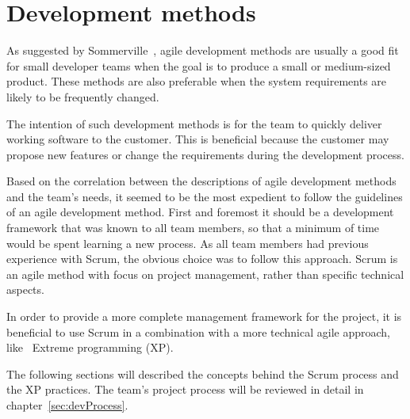 \section{Development methods}
\label{sec:devMethods}

As suggested by Sommerville~\cite{scrum}, agile development methods are usually a good fit for small developer teams when the goal is to produce a small or medium-sized product. These methods are also preferable when the system requirements are likely to be frequently changed.

The intention of such development methods is for the team to quickly deliver working software to the customer. This is beneficial because the customer may propose new features or change the requirements during the development process.

Based on the correlation between the descriptions of agile development methods and the team's needs, it seemed to be the most expedient to follow the guidelines of an agile development method. First and foremost it should be a development framework that was known to all team members, so that a minimum of time would be spent learning a new process. As all team members had previous experience with Scrum, the obvious choice was to follow this approach. Scrum is an agile method with focus on project management, rather than specific technical aspects.

In order to provide a more complete management framework for the project, it is beneficial to use Scrum in a combination with a more technical agile approach, like ~\gls{Extreme programming} (XP).

The following sections will described the concepts behind the Scrum process and the XP practices. The team's project process will be reviewed in detail in chapter~\ref{sec:devProcess}.
